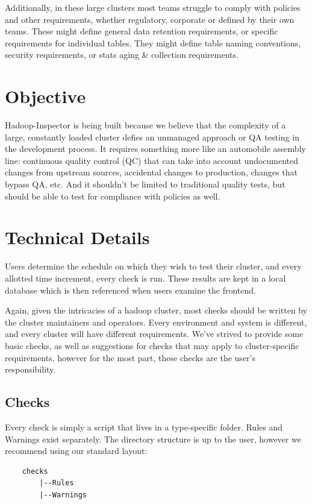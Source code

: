 Additionally, in these large clusters most teams struggle to comply with policies and other requirements, whether
regulatory, corporate or defined by their own teams. These might define general data retention requirements, or specific
requirements for individual tables. They might define table naming conventions, security requirements, or stats aging \&
collection requirements.


\section{Objective}
Hadoop-Inspector is being built because we believe that the complexity of a large, constantly loaded cluster defies an
unmanaged approach or QA testing in the development process. It requires something more like an automobile assembly
line: continuous quality control (QC) that can take into account undocumented changes from upstream sources, accidental
changes to production, changes that bypass QA, etc. And it shouldn't be limited to traditional quality tests, but should
be able to test for compliance with policies as well.


\section{Technical Details}
Users determine the schedule on which they wish to test their cluster, and every allotted time increment, every check
is run. These results are kept in a local database which is then referenced when users examine the frontend.

Again, given the intricacies of a hadoop cluster, most checks should be written by the cluster maintainers and
operators. Every environment and system is different, and every cluster will have different requirements. We've strived
to provide some basic checks, as well as suggestions for checks that may apply to cluster-specific requirements, however
for the most part, these checks are the user's responsibility.

    \subsection{Checks}
    Every check is simply a script that lives in a type-specific folder. Rules and Warnings exist separately. The directory
    structure is up to the user, however we recommend using our standard layout:

    \begin{verbatim}
    checks
        |--Rules
        |--Warnings
    \end{verbatim}

